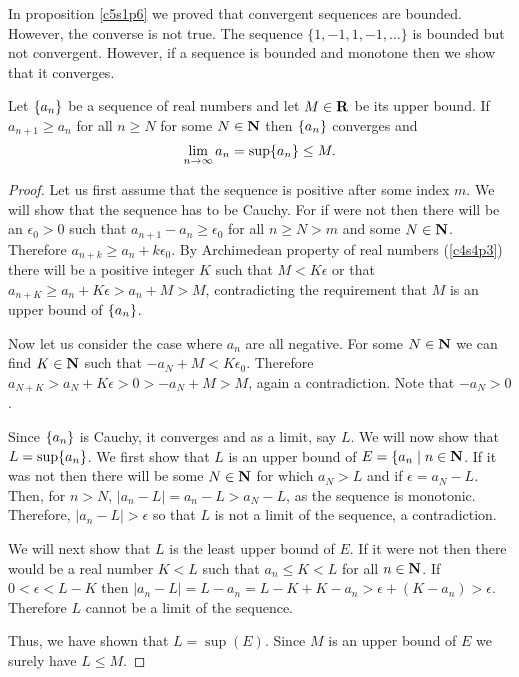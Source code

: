 In proposition \ref{c5s1p6} we proved that convergent sequences are bounded.
However, the converse is not true. The sequence $\{1, -1, 1, -1, \ldots\}$
is bounded but not convergent. However, if a sequence is bounded and monotone
then we show that it converges. 
\begin{prop}\label{c5s3p3}
Let $\{a_n\}$ be a sequence of real numbers and let $M \in \mathbf{R}$ be its
upper bound. If $a_{n+1} \ge a_n$ for all $n \ge N$ for some $N \in \mathbf{N}$
then $\{a_n\}$ converges and
\[
\lim_{n \rightarrow \infty}a_n = \sup\{a_n\} \le M.
\]
\end{prop}
\begin{proof}
Let us first assume that the sequence is positive after some index $m$. 
We will show that the sequence has to be Cauchy. For if were not then there
will be an $\epsilon_0 > 0$ such that $a_{n+1} - a_n \ge \epsilon_0$ for
all $n \ge N > m$ and some $N \in \mathbf{N}$. Therefore $a_{n + k} \ge a_n + 
k\epsilon_0$. By 
Archimedean property of real numbers (\ref{c4s4p3}) there will be a positive 
integer $K$ such that $M < K\epsilon$ or that $a_{n + K} \ge a_n + 
K\epsilon > a_n + M > M$, contradicting the requirement that $M$ is an upper
bound of $\{a_n\}$.

Now let us consider the case where $a_n$ are all negative. For some $N \in
\mathbf{N}$ we can find $K \in \mathbf{N}$ such that $-a_N + M < K\epsilon_0$. Therefore
$a_{N + K} > a_N + K\epsilon>0 > -a_N + M > M$, again a contradiction. Note
that $-a_N > 0$.

Since $\{a_n\}$ is Cauchy, it converges and as a limit, say $L$. We will
now show that $L = \sup\{a_n\}$. We first show that $L$ is an upper bound
of $E = \{a_n \;|\; n \in \mathbf{N}$. If it was not then there will be some $N
\in \mathbf{N}$ for which $a_N > L$ and if $\epsilon = a_N - L$. Then, for $n > N$,
$|a_n - L| = a_n - L > a_N - L$, as the sequence is monotonic. Therefore,
$|a_n - L| > \epsilon$ so that $L$ is not a limit of the sequence, a
contradiction. 

We will next show that $L$ is the least upper bound of $E$. If it were
not then there would be a real number $K < L$ such that $a_n \le K < L$ for
all $n \in \mathbf{N}$. If $0 < \epsilon < L - K$ then $|a_n - L| = L - a_n =
L - K + K - a_n > \epsilon + (K - a_n) > \epsilon$. Therefore $L$ cannot be
a limit of the sequence.

Thus, we have shown that $L = \sup(E)$. Since $M$ is an upper bound of $E$
we surely have $L \le M$.
\end{proof}


